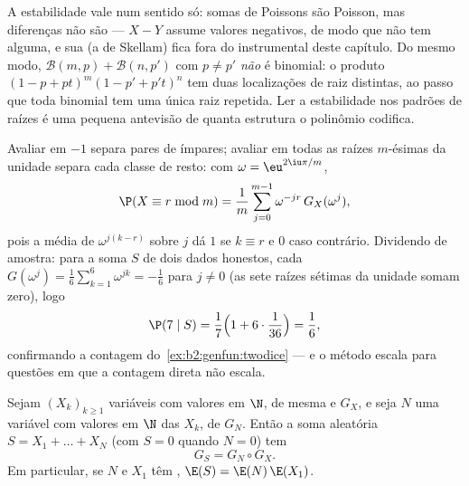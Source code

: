 \begin{remark}
A estabilidade vale num sentido só: somas de Poissons  são
Poisson, mas diferenças não são --- $X - Y$ assume valores
negativos, de modo que não tem  alguma, e sua 
(a  de Skellam) fica fora do instrumental deste
capítulo. Do mesmo modo, $\mathcal B(m, p) + \mathcal B(n, p')$ com
$p \neq p'$ \emph{não} é binomial: o produto $(1 - p +
pt)^m(1 - p' + p't)^n$ tem duas localizações de raiz distintas, ao passo que
toda  binomial tem uma única raiz repetida. Ler a
estabilidade nos padrões de raízes é uma pequena antevisão de quanta
estrutura o polinômio codifica.
\end{remark}

\begin{remark}
Avaliar em $-1$ separa pares de ímpares; avaliar em todas as
raízes $m$-ésimas da unidade separa cada classe de resto: com
$\omega = \eu^{2\iu\pi/m}$,
\[
\P(X \equiv r \bmod m)
= \frac1m\sum_{j=0}^{m-1}\omega^{-jr}\,G_X(\omega^j),
\]
pois a média de $\omega^{j(k-r)}$ sobre $j$ dá $1$ se $k
\equiv r$ e $0$ caso contrário. Dividendo de amostra: para a soma $S$
de dois dados honestos, cada $G(\omega^j) = \frac16\sum_{k=1}^6
\omega^{jk} = -\frac16$ para $j \neq 0$ (as sete raízes sétimas
da unidade somam zero), logo
\[
\P(7 \mid S) = \frac17\Bigl(1 +
6\cdot\frac1{36}\Bigr) = \frac16 ,
\]
confirmando a contagem do~\cref{ex:b2:genfun:twodice} ---
e o método escala para questões em que a contagem direta
não escala.
\end{remark}

\begin{theorem}\label{thm:b2:genfun:compound}
Sejam $(X_k)_{k\geq1}$ variáveis  com valores em $\N$, de mesma
 e  $G_X$, e seja $N$ uma
variável com valores em $\N$  das $X_k$, de  $G_N$. Então a soma aleatória $S = X_1 + \dots + X_N$ (com
$S = 0$ quando $N = 0$) tem 
\[
G_S = G_N \circ G_X .
\]
Em particular, se $N$ e $X_1$ têm , $\E(S) =
\E(N)\,\E(X_1)$.
\end{theorem}

